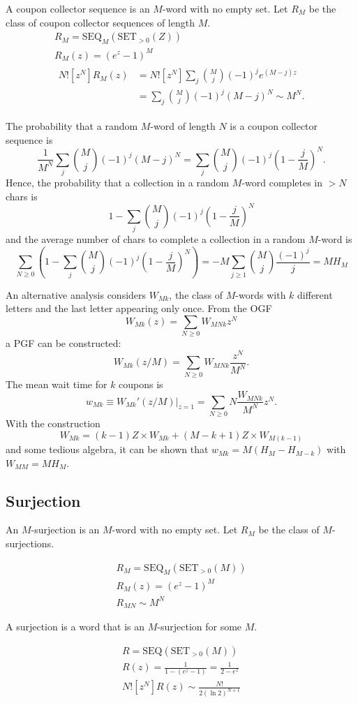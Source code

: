 \documentclass{article}
\begin{document}
A coupon collector sequence is an $M$-word with no empty set. Let $R_M$ be the
class of coupon collector sequences of length $M$.
\begin{gather*}
  R_M = \mathrm{SEQ}_M(\mathrm{SET}_{> 0}(Z)) \\
  R_M(z) = (e^z - 1)^M \\
  \begin{aligned}
    N![z^N]R_M(z)
    &= N![z^N] \sum_j \binom{M}{j} (-1)^j e^{(M - j)z} \\
    &= \sum_j \binom{M}{j} (-1)^j (M - j)^N \sim M^N.
  \end{aligned}
\end{gather*}

The probability that a random $M$-word of length $N$ is a coupon collector
sequence is \[
  \frac{1}{M^N} \sum_j \binom{M}{j} (-1)^j (M - j)^N
  = \sum_j \binom{M}{j} (-1)^j \left(1 - \frac{j}{M}\right)^N.
\] Hence, the probability that a collection in a random $M$-word completes in
$> N$ chars is \[
  1 - \sum_j \binom{M}{j} (-1)^j \left(1 - \frac{j}{M}\right)^N
\] and the average number of chars to complete a collection in a random
$M$-word is \[
  \sum_{N \geq 0} \left(
    1 - \sum_j \binom{M}{j} (-1)^j \left(1 - \frac{j}{M}\right)^N
  \right)
  = -M\sum_{j \geq 1} \binom{M}{j} \frac{(-1)^j}{j}
  = MH_M
\]

An alternative analysis considers $W_{Mk}$, the class of $M$-words with $k$
different letters and the last letter appearing only once. From the OGF \[
  W_{Mk}(z) = \sum_{N \geq 0} W_{MNk}z^N
\] a PGF can be constructed: \[
  W_{Mk}(z/M) = \sum_{N \geq 0} W_{MNk}\frac{z^N}{M^N}.
\] The mean wait time for $k$ coupons is \[
  w_{Mk} \equiv \left.W_{Mk}'(z/M)\right|_{z = 1}
  = \sum_{N \geq 0} N\frac{W_{MNk}}{M^N}z^N.
\] With the construction \[
  W_{Mk} = (k - 1)Z \times W_{Mk} + (M - k + 1)Z \times W_{M(k - 1)}
\] and some tedious algebra, it can be shown that $w_{Mk} = M(H_M - H_{M - k})$
with $W_{MM} = MH_M$.

\subsection{Surjection}

An $M$-surjection is an $M$-word with no empty set. Let $R_M$ be the class of
$M$-surjections.

\begin{gather*}
  R_M = \mathrm{SEQ}_M(\mathrm{SET}_{> 0}(M)) \\
  R_M(z) = (e^z - 1)^M \\
  R_{MN} \sim M^N
\end{gather*}

A surjection is a word that is an $M$-surjection for some $M$.

\begin{gather*}
  R = \mathrm{SEQ}(\mathrm{SET}_{> 0}(M)) \\
  R(z) = \frac{1}{1 - (e^z - 1)} = \frac{1}{2 - e^z} \\
  N![z^N]R(z) \sim \frac{N!}{2(\ln 2)^{N + 1}}
\end{gather*}
\end{document}
